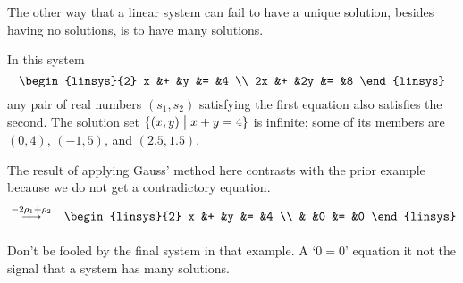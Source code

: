 The other way that 
a linear system can fail to have a unique solution, besides having no solutions,
is to have many solutions.

\begin{example}
In this system
\begin{equation*}
  \begin{linsys}{2}
    x  &+  &y   &=  &4  \\
   2x  &+  &2y  &=  &8  
  \end{linsys}
\end{equation*}
any pair of real numbers $(s_1,s_2)$ satisfying the first equation also
satisfies the second.
The solution set \( \{ (x,y)\bigm| x+y=4 \} \) is infinite; some
of its members are~$(0,4)$, $(-1,5)$, and $(2.5,1.5)$.

The result of applying Gauss' method here contrasts with the prior example
because we do not get a contradictory equation.
\begin{eqnarray*}
  &\grstep{-2\rho_1 + \rho_2}
  &\begin{linsys}{2}
    x  &+  &y   &=  &4  \\
       &   &0   &=  &0  
   \end{linsys}
\end{eqnarray*}
\end{example}

Don't be fooled by the final system in that example.
A `$0=0$' equation it not the signal that a system has many solutions.

